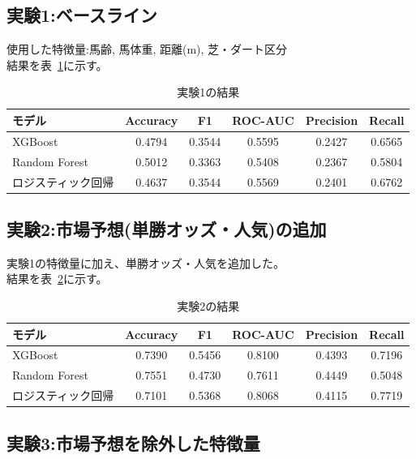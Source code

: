 \documentclass[dvipdfmx, a4paper, 11pt, titlepage]{jsarticle}
\begin{document}
\subsection{実験1:ベースライン}

使用した特徴量:馬齢, 馬体重, 距離(m), 芝・ダート区分\\
結果を表~\ref{tab:exp1}に示す。

\begin{table}[H]
  \centering
  \caption{実験1の結果}
  \label{tab:exp1}
  \begin{tabular}{lccccc}
    \toprule
    モデル & Accuracy & F1 & ROC-AUC & Precision & Recall \\
    \midrule
    XGBoost           & 0.4794 & 0.3544 & 0.5595 & 0.2427 & 0.6565 \\
    Random Forest     & 0.5012 & 0.3363 & 0.5408 & 0.2367 & 0.5804 \\
    ロジスティック回帰 & 0.4637 & 0.3544 & 0.5569 & 0.2401 & 0.6762 \\
    \bottomrule
  \end{tabular}
\end{table}

\subsection{実験2:市場予想(単勝オッズ・人気)の追加}

実験1の特徴量に加え、単勝オッズ・人気を追加した。\\
結果を表~\ref{tab:exp2}に示す。

\begin{table}[H]
  \centering
  \caption{実験2の結果}
  \label{tab:exp2}
  \begin{tabular}{lccccc}
    \toprule
    モデル & Accuracy & F1 & ROC-AUC & Precision & Recall \\
    \midrule
    XGBoost           & 0.7390 & 0.5456 & 0.8100 & 0.4393 & 0.7196 \\
    Random Forest     & 0.7551 & 0.4730 & 0.7611 & 0.4449 & 0.5048 \\
    ロジスティック回帰 & 0.7101 & 0.5368 & 0.8068 & 0.4115 & 0.7719 \\
    \bottomrule
  \end{tabular}
\end{table}

\subsection{実験3:市場予想を除外した特徴量}
\end{document}
